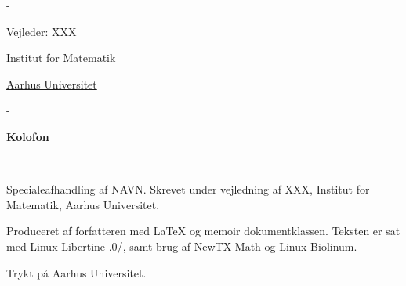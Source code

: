 \begin{titlingpage}
\begin{adjustwidth*}{\frontpagecorrection-2cm}{-\frontpagecorrection-2cm}
    \vfill
    
    Vejleder: XXX \par
    
    \vfill
    
    \fontsize{12pt}{14.5pt}\selectfont
    \href{http://www.math.au.dk/}{Institut for Matematik}\par
    \href{http://www.au.dk/}{Aarhus Universitet}
  \end{adjustwidth*}
  
    \newpage
    \begin{adjustwidth*}{\frontpagecorrection}{-\frontpagecorrection}
    	\thispagestyle{empty}
    	\strut
    	\setlength{\parindent}{0pt}
    	\addtolength{\parskip}{.6em}
    	
    	\vfill
    	
    	\begin{center}
    		\bfseries\sffamily Kolofon
    	\end{center}
    	
    	\makeatletter
    	\edef\fontandleading{\@memptsize.0/\the\baselineskip}
    	\makeatother
    	
    	\small
    	
    	\textsl{\projecttitle}
    	
    	{---\textsl{\projecttitleenglish}}
    	
    	\smallskip
    	
    	Specialeafhandling af NAVN. Skrevet under
        vejledning af XXX, Institut for Matematik, Aarhus Universitet.
    	
    	Produceret af forfatteren med \LaTeX{} og \textsf{memoir}
        dokumentklassen. Teksten er sat med Linux Libertine
        {\fontandleading}, samt brug af NewTX Math og Linux
        Biolinum.
    	
    	Trykt på Aarhus Universitet.
    	
    \end{adjustwidth*}
    
\end{titlingpage}
